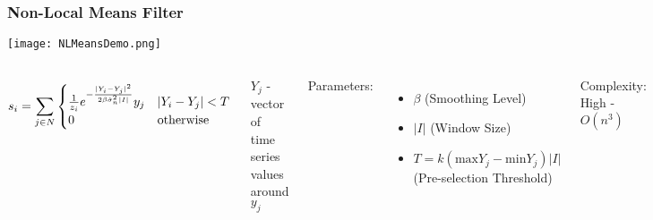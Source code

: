 \documentclass{beamer}
\begin{document}
\begin{frame}
\begin{center}
\frametitle{Non-Local Means Filter}

\texttt{[image: NLMeansDemo.png]}

\small{

\begin{columns}

\column{2.5 in}

\begin{displaymath}
s_i = \sum _{j \in N}
\begin{cases}
\frac{1}{z_i} e^{-\frac{\lvert Y_i - Y_j \rvert ^2}{2 \beta \hat{\sigma}^2_n \lvert I \rvert}} y_j & \lvert Y_i - Y_j \rvert < T \\
0 & $otherwise$
\end{cases}
\end{displaymath}

$Y_j$ - vector of time series values around $y_j$\\

$ $\\

$ $\\

\column{2.5 in}
\justifying

Parameters:

\tiny{

\begin{itemize}

\item $\beta$ (Smoothing Level)

\item $\lvert I \rvert$ (Window Size)

\item $T = k \left( \mathrm{max} Y_j - \mathrm{min} Y_j \right) \lvert I \rvert$ (Pre-selection Threshold)

\end{itemize}

}

\small{

Complexity: High - $O \left( n^3 \right)$

}

\end{columns}
}

\end{center}
\end{frame}

\end{document}
